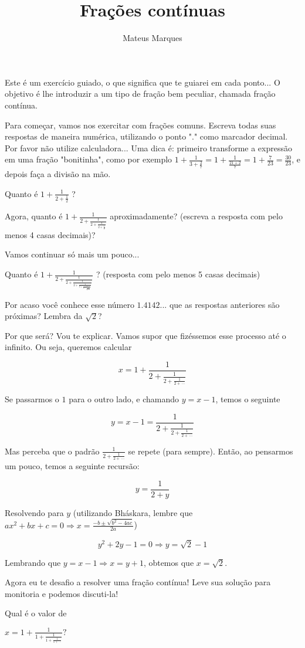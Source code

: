\documentclass[a4paper,fleqn,12pt]{article}
\title{\Huge{\textbf{Frações contínuas}}}
\author{Mateus Marques}
\begin{document}
\maketitle

Este é um exercício guiado, o que significa que te guiarei em cada ponto... O objetivo é lhe introduzir a um tipo de fração bem peculiar, chamada fração contínua.

Para começar, vamos nos exercitar com frações comuns. Escreva todas suas respostas de maneira numérica, utilizando o ponto "." como marcador decimal. Por favor não utilize calculadora... Uma dica é: primeiro transforme a expressão em uma fração "bonitinha", como por exemplo $\displaystyle{1 + \frac{1}{3 + \frac{2}{7}} = 1 + \frac{1}{\frac{21 + 2}{7}} = 1 + \frac{7}{23} = \frac{30}{23}}$, e depois faça a divisão na mão.

Quanto é $\displaystyle{1 + \frac{1}{2 + \frac{1}{2}}}$ ?

Agora, quanto é $\displaystyle{1 + \frac{1}{2 + \frac{1}{2 + \frac{1}{2 + \frac{1}{2}}}}}$ aproximadamente? (escreva a resposta com pelo menos 4 casas decimais)?


Vamos continuar só mais um pouco...

Quanto é $\displaystyle{1 + \frac{1}{2 + \frac{1}{2 + \frac{1}{2 + \frac{1}{2 + \frac{1}{2 + \frac{1}{2 + \frac{1}{2}}}}}}}}$ ? (resposta com pelo menos 5 casas decimais)


Por acaso você conhece esse número $1.4142...$ que as respostas anteriores são próximas? Lembra da $\sqrt{2}$?


Por que será? Vou te explicar. Vamos supor que fizéssemos esse processo até o infinito. Ou seja, queremos calcular

$$ \displaystyle{ x = 1 + \frac{1}{2 + \frac{1}{2 + \frac{1}{2 + \, \cdots}}} } $$

Se passarmos o $1$ para o outro lado, e chamando $y = x-1$, temos o seguinte

$$ \displaystyle{ y = x-1 = \frac{1}{2 + \frac{1}{2 + \frac{1}{2 + \, \cdots}}} } $$

Mas perceba que o padrão $\displaystyle{\frac{1}{2 + \frac{1}{2 + \, \cdots}}}$ se repete (para sempre). Então, ao pensarmos um pouco, temos a seguinte recursão:

$$ \displaystyle{ y = \frac{1}{2 + y} } $$

Resolvendo para $y$ (utilizando Bháskara, lembre que $\displaystyle{ax^2 + bx + c = 0 \Rightarrow x = \frac{-b \pm \sqrt{b^2 - 4ac}}{2a}}$)

$$ \displaystyle{ y^2 + 2y - 1 = 0 \Rightarrow y = \sqrt{2} - 1 } $$

Lembrando que $ \displaystyle{ y = x-1 \Rightarrow x = y + 1 } $, obtemos que $x = \sqrt{2}$.

Agora eu te desafio a resolver uma fração contínua! Leve sua solução para monitoria e podemos discuti-la!

Qual é o valor de

$ \displaystyle{ x = 1 + \frac{1}{1 + \frac{1}{1 + \frac{1}{1 + \, \cdots}}} ? } $
\end{document}
